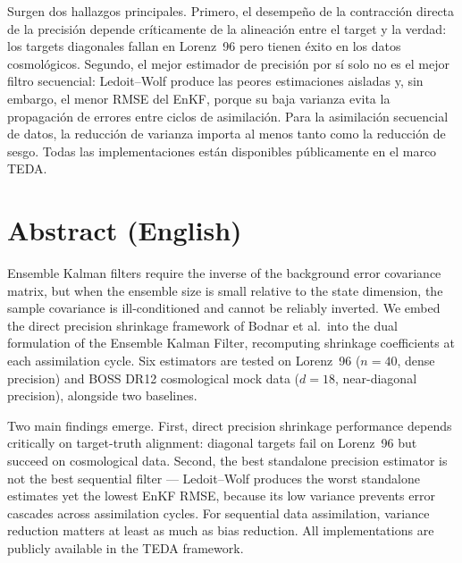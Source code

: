 \documentclass[11pt, a4paper]{article}
\begin{document}
Surgen dos hallazgos principales. Primero, el desempe\~no de la contracci\'on directa de la precisi\'on depende cr\'iticamente de la alineaci\'on entre el target y la verdad: los targets diagonales fallan en Lorenz~96 pero tienen \'exito en los datos cosmol\'ogicos. Segundo, el mejor estimador de precisi\'on por s\'i solo no es el mejor filtro secuencial: Ledoit--Wolf produce las peores estimaciones aisladas y, sin embargo, el menor RMSE del EnKF, porque su baja varianza evita la propagaci\'on de errores entre ciclos de asimilaci\'on. Para la asimilaci\'on secuencial de datos, la reducci\'on de varianza importa al menos tanto como la reducci\'on de sesgo. Todas las implementaciones est\'an disponibles p\'ublicamente en el marco TEDA.


\section*{Abstract (English)}

Ensemble Kalman filters require the inverse of the background error covariance matrix, but when the ensemble size is small relative to the state dimension, the sample covariance is ill-conditioned and cannot be reliably inverted. We embed the direct precision shrinkage framework of Bodnar et al.\ into the dual formulation of the Ensemble Kalman Filter, recomputing shrinkage coefficients at each assimilation cycle. Six estimators are tested on Lorenz~96 ($n=40$, dense precision) and BOSS DR12 cosmological mock data ($d=18$, near-diagonal precision), alongside two baselines.

Two main findings emerge. First, direct precision shrinkage performance depends critically on target-truth alignment: diagonal targets fail on Lorenz~96 but succeed on cosmological data. Second, the best standalone precision estimator is not the best sequential filter --- Ledoit--Wolf produces the worst standalone estimates yet the lowest EnKF RMSE, because its low variance prevents error cascades across assimilation cycles. For sequential data assimilation, variance reduction matters at least as much as bias reduction. All implementations are publicly available in the TEDA framework.
\end{document}
